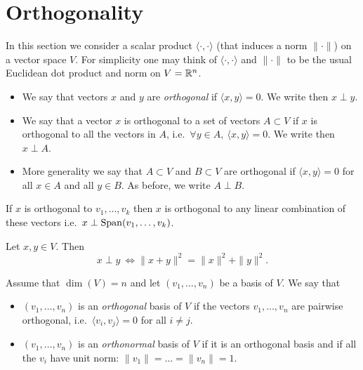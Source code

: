 \documentclass[11pt,nocut]{article}
\begin{document}
\section{Orthogonality}

In this section we consider a scalar product $\langle \cdot, \cdot \rangle$ (that induces a norm $\| \cdot \|$) on a vector space $V$. For simplicity one may think of $\langle \cdot, \cdot \rangle$ and $\| \cdot \|$ to be the usual Euclidean dot product and norm on $V = \mathbb{R}^n$.

\begin{definition}[Orthogonality]
	\begin{itemize}
		\item We say that vectors $x$ and $y$ are \emph{orthogonal} if $\langle x,y \rangle = 0$. We write then $x \perp y$.
		\item We say that a vector $x$ is orthogonal to a set of vectors $A \subset V$ if $x$ is orthogonal to all the vectors in $A$, i.e.\ $\forall y \in A, \ \langle x,y\rangle = 0$. We write then $x \perp A$.
		\item More generality we say that $A \subset V$ and $B \subset V$ are orthogonal if $\langle x,y \rangle = 0$ for all $x \in A$ and all $y \in B$. As before, we write $A \perp B$.
	\end{itemize}
\end{definition}


\begin{proposition}
	If $x$ is orthogonal to $v_1, \dots, v_k$ then $x$ is orthogonal to any linear combination of these vectors i.e.\ $x \perp {{\rm Span}}(v_1, \dots, v_k)$.
\end{proposition}

\begin{theorem}
	Let $x,y \in V$. Then
	$$
	x \perp y \ \Longleftrightarrow \|x+y\|^2 = \|x\|^2 + \|y\|^2.
	$$
\end{theorem}


\begin{definition}
	Assume that $\dim(V)=n$ and let $(v_1, \dots, v_n)$ be a basis of $V$. We say that
	\begin{itemize}
		\item $(v_1, \dots, v_n)$ is an \emph{orthogonal} basis of $V$ if the vectors $v_1, \dots, v_n$ are pairwise orthogonal, i.e.\ $\langle v_i, v_j \rangle = 0$ for all $i \neq j$.
		\item $(v_1, \dots, v_n)$ is an \emph{orthonormal} basis of $V$ if it is an orthogonal basis and if all the $v_i$ have unit norm: $\|v_1\| = \dots = \|v_n\| = 1$.
	\end{itemize}
\end{definition}
\end{document}
